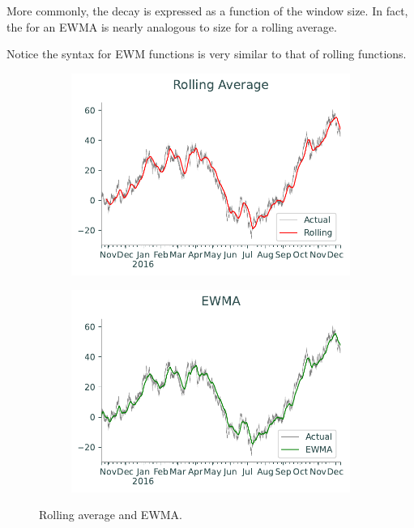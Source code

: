 More commonly, the decay is expressed as a function of the window size.
In fact, the  for an EWMA is nearly analogous to  size for a rolling average.

Notice the syntax for EWM functions is very similar to that of rolling functions.

\begin{figure}[H] %
\captionsetup[subfigure]{justification=centering}
\centering
\begin{subfigure}{.49\textwidth}
    \centering
    \includegraphics[width=\textwidth]{figures/moving_rolling.pdf}
    \caption{}
    \label{fig:pandas-ts-moving-rolling}
\end{subfigure}
%
\begin{subfigure}{.49\textwidth}
    \centering
    \includegraphics[width=\textwidth]{figures/moving_ewma.pdf}
    \caption{}
    \label{fig:pandas-ts-moving-ewma}
\end{subfigure}
\caption{Rolling average and EWMA.}
\end{figure}

